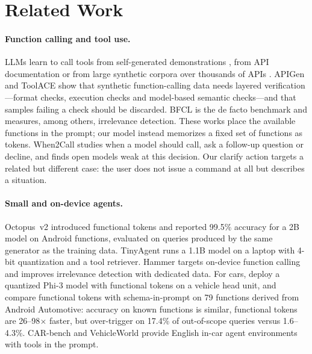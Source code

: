 \section{Related Work}
\label{sec:related}

\paragraph{Function calling and tool use.}
LLMs learn to call tools from self-generated demonstrations \citep{schick2023toolformer}, from API documentation
\citep{patil2024gorilla} or from large synthetic corpora over thousands of APIs \citep{qin2024toolllm}. APIGen
\citep{liu2024apigen} and ToolACE \citep{liu2024toolace} show that synthetic function-calling data needs layered
verification---format checks, execution checks and model-based semantic checks---and that samples failing a check should be
discarded. BFCL \citep{patil2025bfcl} is the de facto benchmark and measures, among others, irrelevance detection. These
works place the available functions in the prompt; our model instead memorizes a fixed set of functions as tokens. When2Call
\citep{ross2025when2call} studies when a model should call, ask a follow-up question or decline, and finds open models weak at
this decision. Our clarify action targets a related but different case: the user does not issue a command at all but
describes a situation.

\paragraph{Small and on-device agents.}
Octopus~v2 \citep{chen2024octopus} introduced functional tokens and reported 99.5\% accuracy for a 2B model on Android
functions, evaluated on queries produced by the same generator as the training data. TinyAgent \citep{erdogan2024tinyagent}
runs a 1.1B model on a laptop with 4-bit quantization and a tool retriever. Hammer \citep{lin2024hammer} targets on-device
function calling and improves irrelevance detection with dedicated data. For cars, \citet{sowti2025optimizing} deploy a
quantized Phi-3 model with functional tokens on a vehicle head unit, and \citet{jafarzadeh2026fixedkeys} compare
functional tokens with schema-in-prompt on 79 functions derived from Android Automotive: accuracy on known functions is
similar, functional tokens are 26--98$\times$ faster, but over-trigger on 17.4\% of out-of-scope queries versus 1.6--4.3\%.
CAR-bench \citep{kirmayr2026carbench} and VehicleWorld \citep{yang2025vehicleworld} provide English in-car agent
environments with tools in the prompt.

